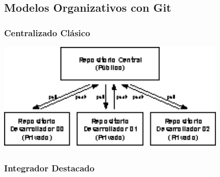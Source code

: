 \documentclass[animated,a4paper,slidestop,xcolor=pst,blue]{beamer}
\begin{document}
\subsection{Modelos Organizativos con Git}

\begin{frame}[c]
	\frametitle{Centralizado Clásico}
    \begin{center}
        \includegraphics[width=11cm,keepaspectratio=true]{images/git/esquemaCentralizado.eps}
    \end{center}
\end{frame}

\begin{frame}[t]
	\frametitle{Integrador Destacado}
\end{frame}
\end{document}
